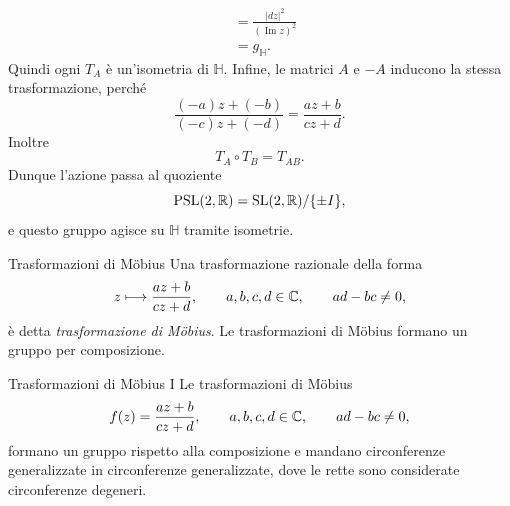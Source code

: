 \documentclass[a4paper]{article}
\begin{document}
\begin{snippetproof}{}
\begin{align*}
        &=
        \frac{|dz|^2}{(\operatorname{Im}z)^2}\\
        &=
        g_{\mathbb{H}}.
    \end{align*}
    Quindi ogni \(T_A\) è un'isometria di \(\mathbb{H}\).
    Infine, le matrici \(A\) e \(-A\) inducono la stessa trasformazione, perché
    \[
        \frac{(-a)z+(-b)}{(-c)z+(-d)}
        =
        \frac{az+b}{cz+d}.
    \]
    Inoltre
    \[
        T_A\circ T_B=T_{AB}.
    \]
    Dunque l'azione passa al quoziente
    \[
        \operatorname{PSL}(2,\mathbb{R})
        =
        \operatorname{SL}(2,\mathbb{R})/\{\pm I\},
    \]
    e questo gruppo agisce su \(\mathbb{H}\) tramite isometrie.
\end{snippetproof}

\begin{snippetdefinition}{Trasformazioni di M\"obius}
Una trasformazione razionale della forma
\[
    z\longmapsto \frac{az+b}{cz+d},
    \qquad
    a,b,c,d\in\mathbb{C},
    \qquad
    ad-bc\neq 0,
\]
è detta \emph{trasformazione di M\"obius}. Le trasformazioni di M\"obius formano un gruppo per composizione.
\end{snippetdefinition}

\begin{snippetproposition}{Trasformazioni di Möbius I}
    Le trasformazioni di Möbius
    \[
        f(z)=\frac{az+b}{cz+d},
        \qquad
        a,b,c,d\in\mathbb{C},
        \qquad
        ad-bc\neq 0,
    \]
    formano un gruppo rispetto alla composizione e mandano circonferenze generalizzate
    in circonferenze generalizzate, dove le rette sono considerate circonferenze degeneri.
\end{snippetproposition}
\end{document}
